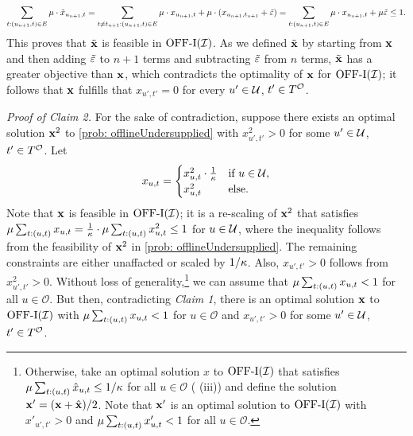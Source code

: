 {{  }
  \begin{align}
      \sum_{t: (u_{n+1}, t) \in E} \prob \cdot \Tilde{x}_{u_{n+1}, t} =  \sum_{t \not= t_{n+1}: (u_{n+1}, t) \in E} \prob \cdot x_{u_{n+1}, t} + \prob \cdot (x_{u_{n+1}, t_{n+1}} + \Tilde{\varepsilon}) = \sum_{t: (u_{n+1}, t) \in E} \prob \cdot x_{u_{n+1}, t} + \prob \Tilde{\varepsilon} %
       \leq 1. \notag
  \end{align}
  This proves that $\Tilde{\mathbf{x}}$ is feasible in $\mathrm{\mathrm{OFF}}\textrm{-}\mathrm{I}(\mathcal I)$. As we defined $\Tilde{\mathbf{x}}$ by starting from $\mathbf{x}$ and then adding $\Tilde{\varepsilon}$ to $n+1$ terms and subtracting $\Tilde{\varepsilon}$ from $n$ terms, $\Tilde{\mathbf{x}}$ has a greater objective than $\mathbf{x}$, which contradicts the optimality of $\mathbf{x}$ for $\mathrm{\mathrm{OFF}}\textrm{-}\mathrm{I}(\mathcal I)$; it follows that $\mathbf{x}$ fulfills that $x_{u',t'} =0$ for every $u' \in \mathcal U$, $t' \in T^\mathcal O$. 
 
 \textit{Proof of Claim 2.} For the sake of contradiction, suppose there exists an optimal solution $\mathbf{x}^2$ to \ref{prob: offlineUndersupplied} with $x^2_{u',t'} > 0$ for some $u' \in \mathcal U$, $t' \in T^\mathcal O$. Let
 \begin{equation*}
     x_{u,t} = \begin{cases}
            x^2_{u,t} \cdot \frac{1}{\kappa} & \text{if $u \in \mathcal U$},\\
            x^2_{u,t} & \text{else.}
    \end{cases}
 \end{equation*}
 Note that $\mathbf{x}$ is feasible in $\mathrm{\mathrm{OFF}}\textrm{-}\mathrm{I}(\mathcal I)$; it is a re-scaling of $\mathbf{x}^2$ that satisfies $\mu \sum_{t: (u,t)} x_{u,t} = \frac{1}{\kappa} \cdot \mu \sum_{t: (u,t)} x^2_{u,t}  \leq 1$ for $u \in \mathcal {\mathcal U}$, where the inequality follows from the feasibility of $\mathbf{x}^2$ in \ref{prob: offlineUndersupplied}. The remaining constraints are either unaffacted or scaled by $1/\kappa$.
  Also, $x_{u',t'} > 0$ follows from $x^2_{u',t'} > 0$. Without loss of generality,\footnote{Otherwise, take an optimal solution $\hat{x}$ to $\mathrm{\mathrm{OFF}}\textrm{-}\mathrm{I}(\mathcal I)$ that satisfies $\mu \sum_{t: (u,t)} \hat{x}_{u,t} \leq 1/\kappa$ for all $u \in \mathcal O$ ( (iii)) and define the solution $\mathbf{x}'=(\mathbf{x} + \hat{\mathbf{x}})/2$. Note that $\mathbf{x}'$ is an optimal solution to $\mathrm{\mathrm{OFF}}\textrm{-}\mathrm{I}(\mathcal I)$ with $x'_{u',t'} > 0$ and $\mu \sum_{t: (u,t)} x_{u,t}' < 1$ for all $u \in \mathcal O$.} we can assume that $\mu \sum_{t: (u,t)} x_{u,t} < 1$ for all $u \in \mathcal O$.
  But then, contradicting \emph{Claim 1}, there is  an optimal solution $\mathbf{x}$ to $\mathrm{\mathrm{OFF}}\textrm{-}\mathrm{I}(\mathcal I)$ with $\mu \sum_{t: (u,t)} x_{u,t} <1$ for $u \in \mathcal O$ and $x_{u',t'} > 0$ for some $u' \in \mathcal U$, $t' \in T^{\mathcal O}$. 
 \hfill \Halmos



}
